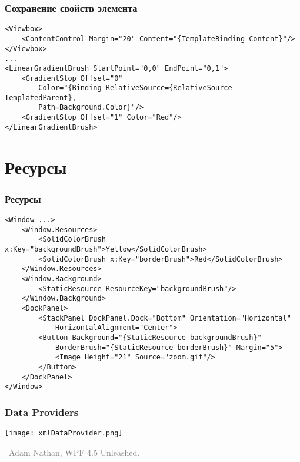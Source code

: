 \documentclass[xetex,mathserif,serif]{beamer}
\newcommand{\attribution}[1] {
\vspace{-5mm}\begin{flushright}\begin{scriptsize}\textcolor{gray}{\textcopyright\, #1}\end{scriptsize}\end{flushright}
}
\begin{document}
	\begin{frame}[fragile]
		\frametitle{Сохранение свойств элемента}
		\begin{scriptsize}
			\begin{verbatim}
<Viewbox>
    <ContentControl Margin="20" Content="{TemplateBinding Content}"/>
</Viewbox>
...
<LinearGradientBrush StartPoint="0,0" EndPoint="0,1">
    <GradientStop Offset="0"
        Color="{Binding RelativeSource={RelativeSource TemplatedParent},
        Path=Background.Color}"/>
    <GradientStop Offset="1" Color="Red"/>
</LinearGradientBrush>
			\end{verbatim}
		\end{scriptsize}
	\end{frame}

	\section{Ресурсы}

	\begin{frame}[fragile]
		\frametitle{Ресурсы}
		\begin{scriptsize}
			\begin{verbatim}
<Window ...>
    <Window.Resources>
        <SolidColorBrush x:Key="backgroundBrush">Yellow</SolidColorBrush>
        <SolidColorBrush x:Key="borderBrush">Red</SolidColorBrush>
    </Window.Resources>
    <Window.Background>
        <StaticResource ResourceKey="backgroundBrush"/>
    </Window.Background>
    <DockPanel>
        <StackPanel DockPanel.Dock="Bottom" Orientation="Horizontal"
            HorizontalAlignment="Center">
        <Button Background="{StaticResource backgroundBrush}"
            BorderBrush="{StaticResource borderBrush}" Margin="5">
            <Image Height="21" Source="zoom.gif"/>
        </Button>
    </DockPanel>
</Window>
			\end{verbatim}
		\end{scriptsize}
	\end{frame}

	\begin{frame}
		\frametitle{Data Providers}
		\begin{center}
			\texttt{[image: xmlDataProvider.png]}
		\end{center}
		\attribution{Adam Nathan, WPF 4.5 Unleashed.}
	\end{frame}
\end{document}
